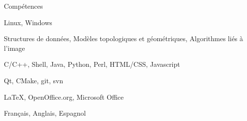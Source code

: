 \begin{rubric}{Compétences}
  
  \entry*[Systèmes]%
  Linux, Windows
  
  \entry*[Image]%
  Structures de données, Modèles topologiques et géométriques, Algorithmes liés à l'image

  \entry*[Langages]%
  C/C++, Shell, Java, Python, Perl, HTML/CSS, Javascript
  
  \entry*[Outils]%
  Qt, CMake, git, svn

  \entry*[Bureautique]%
  \LaTeX{}, OpenOffice.org, Microsoft Office
  
  \entry*[Langues]%
  Français, Anglais, Espagnol
  
\end{rubric}
